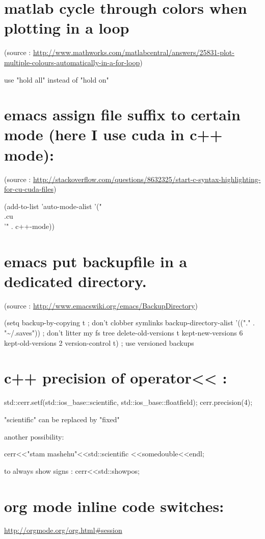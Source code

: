 \documentclass[11pt]{article}
\begin{document}
\section{matlab cycle through colors when plotting in a loop}
\label{sec-45}
(source : \url{http://www.mathworks.com/matlabcentral/answers/25831-plot-multiple-colours-automatically-in-a-for-loop})

use "hold all" instead of "hold on"

\section{emacs assign file suffix to certain mode (here I use cuda in c++ mode):}
\label{sec-46}
(source : \url{http://stackoverflow.com/questions/8632325/start-c-syntax-highlighting-for-cu-cuda-files})

(add-to-list 'auto-mode-alist '("\\.cu\\'" . c++-mode))
\section{emacs put backupfile in a dedicated directory.}
\label{sec-47}
(source : \url{http://www.emacswiki.org/emacs/BackupDirectory})

(setq
   backup-by-copying t      ; don't clobber symlinks
   backup-directory-alist
    '(("." . "\textasciitilde{}/.saves"))    ; don't litter my fs tree
   delete-old-versions t
   kept-new-versions 6
   kept-old-versions 2
   version-control t)       ; use versioned backups

\section{c++ precision of operator<< :}
\label{sec-48}

std::cerr.setf(std::ios\_base::scientific, std::ios\_base::floatfield);
cerr.precision(4);

"scientific" can be replaced by "fixed"

another possibility:

cerr<<"stam mashehu"<<std::scientific  <<somedouble<<endl;

to always show signs :
  cerr<<std::showpos;

\section{org mode inline code switches:}
\label{sec-49}
\url{http://orgmode.org/org.html#session}
\end{document}
